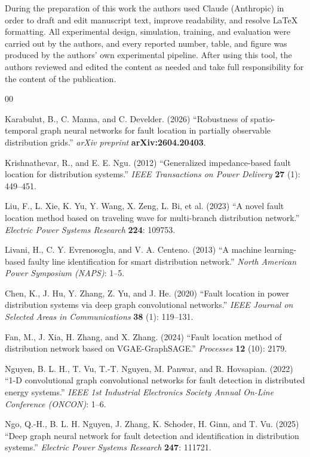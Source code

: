 \documentclass[3p,times,procedia]{elsarticle}
\begin{document}
During the preparation of this work the authors used Claude (Anthropic) in order to draft and edit manuscript text, improve readability, and resolve LaTeX formatting. All experimental design, simulation, training, and evaluation were carried out by the authors, and every reported number, table, and figure was produced by the authors' own experimental pipeline. After using this tool, the authors reviewed and edited the content as needed and take full responsibility for the content of the publication.

\begin{thebibliography}{00}

Karabulut, B., C. Manna, and C. Develder. (2026) ``Robustness
of spatio-temporal graph neural networks for fault location in
partially observable distribution grids.'' {\it arXiv preprint}
{\bf arXiv:2604.20403}.

Krishnathevar, R., and E. E. Ngu. (2012) ``Generalized impedance-based
fault location for distribution systems.'' {\it IEEE Transactions on
Power Delivery} {\bf 27} (1): 449--451.

Liu, F., L. Xie, K. Yu, Y. Wang, X. Zeng, L. Bi, et al. (2023) ``A novel
fault location method based on traveling wave for multi-branch
distribution network.'' {\it Electric Power Systems Research} {\bf 224}:
109753.

Livani, H., C. Y. Evrenosoglu, and V. A. Centeno. (2013) ``A machine
learning-based faulty line identification for smart distribution
network.'' {\it North American Power Symposium (NAPS)}: 1--5.

Chen, K., J. Hu, Y. Zhang, Z. Yu, and J. He. (2020) ``Fault location in
power distribution systems via deep graph convolutional networks.''
{\it IEEE Journal on Selected Areas in Communications} {\bf 38} (1):
119--131.

Fan, M., J. Xia, H. Zhang, and X. Zhang. (2024) ``Fault location method
of distribution network based on VGAE-GraphSAGE.'' {\it Processes}
{\bf 12} (10): 2179.

Nguyen, B. L. H., T. Vu, T.-T. Nguyen, M. Panwar, and R. Hovsapian.
(2022) ``1-D convolutional graph convolutional networks for fault
detection in distributed energy systems.'' {\it IEEE 1st Industrial
Electronics Society Annual On-Line Conference (ONCON)}: 1--6.

Ngo, Q.-H., B. L. H. Nguyen, J. Zhang, K. Schoder, H. Ginn, and T. Vu.
(2025) ``Deep graph neural network for fault detection and
identification in distribution systems.'' {\it Electric Power Systems
Research} {\bf 247}: 111721.


\end{thebibliography}
\end{document}
